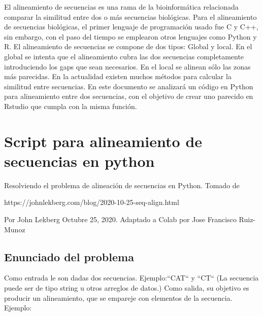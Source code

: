 \documentclass[usenatbib]{tjaa}
\begin{document}
El alineamiento de secuencias es una rama de la bioinformática relacionada comparar la similitud entre dos o más secuencias biológicas. Para el alineamiento de secuencias biológicas, el primer lenguaje de programación usado fue C y C++, sin embargo, con el paso del tiempo se emplearon otros lenguajes como Python y R. El alineamiento de secuencias se compone de dos tipos: Global y local. En el global se intenta que el alineamiento cubra las dos secuencias completamente introduciendo los gaps que sean necesarios. En el local se alinean sólo las zonas más parecidas. En la actualidad existen muchos métodos para calcular la similitud entre secuencias. En este documento se analizará un código en Python para alineamiento entre dos secuencias, con el objetivo de crear uno parecido en Rstudio que cumpla con la misma función. 






\section{Script para alineamiento de secuencias en python}



Resolviendo el problema de alineación de secuencias en Python. Tomado de

https://johnlekberg.com/blog/2020-10-25-seq-align.html

\vspace{1em}

Por John Lekberg  Octubre 25, 2020. Adaptado a Colab por Jose Francisco Ruiz-Munoz

\vspace{1em}
\subsection{Enunciado del problema}
\vspace{1em}

Como entrada le son dadas dos secuencias. Ejemplo:``CAT`` y ``CT`` (La secuencia puede ser de tipo string u otros arreglos de datos.) Como salida, su objetivo es producir un alineamiento, que se empareje con elementos de la secuencia. Ejemplo:
\vspace{1em}
\end{document}
